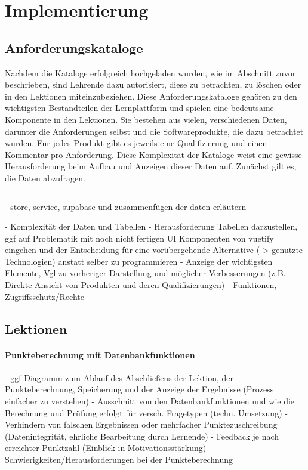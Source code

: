\chapter{Implementierung}

\section{Anforderungskataloge}

Nachdem die Kataloge erfolgreich hochgeladen wurden, wie im Abschnitt zuvor beschrieben, sind Lehrende dazu autorisiert, diese zu betrachten, zu löschen oder in den Lektionen miteinzubeziehen. 
Diese Anforderungskataloge gehören zu den wichtigsten Bestandteilen der Lernplattform und spielen eine bedeutsame Komponente in den Lektionen. 
Sie bestehen aus vielen, verschiedenen Daten, darunter die Anforderungen selbst und die Softwareprodukte, die dazu betrachtet wurden. Für jedes Produkt gibt es jeweils eine Qualifizierung und einen Kommentar pro Anforderung. Diese Komplexität der Kataloge weist eine gewisse Herausforderung beim Aufbau und Anzeigen dieser Daten auf. 
Zunächst gilt es, die Daten abzufragen. 

\inputminted{TypeScript}{assets/code/catalogs/fetch_catalogs_store.ts}

- store, service, supabase und zusammenfügen der daten erläutern

- Komplexität der Daten und Tabellen
- Herausforderung Tabellen darzustellen, ggf auf Problematik mit noch nicht fertigen UI Komponenten von vuetify eingehen und der Entscheidung für eine vorübergehende Alternative (-> genutzte Technologien) anstatt selber zu programmieren
- Anzeige der wichtigsten Elemente, Vgl zu vorheriger Darstellung und möglicher Verbesserungen (z.B. Direkte Ansicht von Produkten und deren Qualifizierungen)
- Funktionen, Zugriffsschutz/Rechte

\section{Lektionen}

\subsubsection{Punkteberechnung mit Datenbankfunktionen}
- ggf Diagramm zum Ablauf des Abschließens der Lektion, der Punkteberechnung, Speicherung und der Anzeige der Ergebnisse (Prozess einfacher zu verstehen)
- Ausschnitt von den Datenbankfunktionen und wie die Berechnung und Prüfung erfolgt für versch. Fragetypen (techn. Umsetzung)
- Verhindern von falschen Ergebnissen oder mehrfacher Punktezuschreibung (Datenintegrität, ehrliche Bearbeitung durch Lernende)
- Feedback je nach erreichter Punktzahl (Einblick in Motivationsstärkung)
- Schwierigkeiten/Herausforderungen bei der Punkteberechnung

